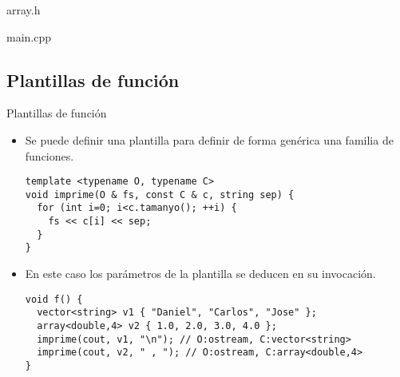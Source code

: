 \begin{frame}
\begin{block}{array.h}

\end{block}
\end{frame}

\begin{frame}
\begin{block}{main.cpp}

\end{block}
\end{frame}

\subsection{Plantillas de función}

\begin{frame}[fragile]{Plantillas de función}
\begin{itemize}
  \item Se puede definir una plantilla para definir de forma genérica
        una familia de funciones.
\begin{lstlisting}
template <typename O, typename C>
void imprime(O & fs, const C & c, string sep) {
  for (int i=0; i<c.tamanyo(); ++i) {
    fs << c[i] << sep;
  }
}
\end{lstlisting}
  \item En este caso los parámetros de la plantilla se deducen en su invocación.
\begin{lstlisting}
void f() {
  vector<string> v1 { "Daniel", "Carlos", "Jose" };
  array<double,4> v2 { 1.0, 2.0, 3.0, 4.0 };
  imprime(cout, v1, "\n"); // O:ostream, C:vector<string>
  imprime(cout, v2, " , "); // O:ostream, C:array<double,4>
}
\end{lstlisting}
\end{itemize}
\end{frame}
